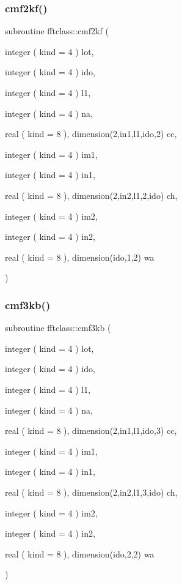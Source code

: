 \mbox{\label{namespacefftclass_a87e04f91c6fd5a8be5cce797b134f4c3}} 
\subsubsection{\texorpdfstring{cmf2kf()}{cmf2kf()}}
{\footnotesize\ttfamily subroutine fftclass\+::cmf2kf (\begin{DoxyParamCaption}\item[{integer ( kind = 4 )}]{lot,  }\item[{integer ( kind = 4 )}]{ido,  }\item[{integer ( kind = 4 )}]{l1,  }\item[{integer ( kind = 4 )}]{na,  }\item[{real ( kind = 8 ), dimension(2,in1,l1,ido,2)}]{cc,  }\item[{integer ( kind = 4 )}]{im1,  }\item[{integer ( kind = 4 )}]{in1,  }\item[{real ( kind = 8 ), dimension(2,in2,l1,2,ido)}]{ch,  }\item[{integer ( kind = 4 )}]{im2,  }\item[{integer ( kind = 4 )}]{in2,  }\item[{real ( kind = 8 ), dimension(ido,1,2)}]{wa }\end{DoxyParamCaption})}

\mbox{\label{namespacefftclass_afc9e57527719d38dc3716ee9bf6b090d}} 
\subsubsection{\texorpdfstring{cmf3kb()}{cmf3kb()}}
{\footnotesize\ttfamily subroutine fftclass\+::cmf3kb (\begin{DoxyParamCaption}\item[{integer ( kind = 4 )}]{lot,  }\item[{integer ( kind = 4 )}]{ido,  }\item[{integer ( kind = 4 )}]{l1,  }\item[{integer ( kind = 4 )}]{na,  }\item[{real ( kind = 8 ), dimension(2,in1,l1,ido,3)}]{cc,  }\item[{integer ( kind = 4 )}]{im1,  }\item[{integer ( kind = 4 )}]{in1,  }\item[{real ( kind = 8 ), dimension(2,in2,l1,3,ido)}]{ch,  }\item[{integer ( kind = 4 )}]{im2,  }\item[{integer ( kind = 4 )}]{in2,  }\item[{real ( kind = 8 ), dimension(ido,2,2)}]{wa }\end{DoxyParamCaption})}

